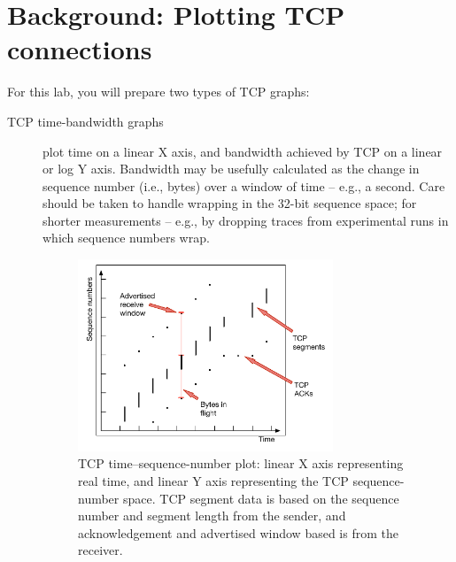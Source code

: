 \documentclass[a4paper,10pt]{article}
\begin{document}
\section*{Background: Plotting TCP connections}

For this lab, you will prepare two types of TCP graphs:

\begin{description}
\item[TCP time-bandwidth graphs] plot time on a linear X axis, and bandwidth
  achieved by TCP on a linear or log Y axis.
  Bandwidth may be usefully calculated as the change in sequence number (i.e.,
  bytes) over a window of time -- e.g., a second.
  Care should be taken to handle wrapping in the 32-bit sequence space; for
  shorter measurements -- e.g., by dropping traces from experimental runs in
  which sequence numbers wrap.

\begin{figure}[t]
\begin{center}
  \includegraphics[width=0.75\textwidth]{../../figures/tcp-time-sequence.pdf}
\end{center}
\caption{TCP time--sequence-number plot: linear X axis representing real time,
and linear Y axis representing the TCP sequence-number space.
TCP segment data is based on the sequence number and segment length from the
sender, and acknowledgement and advertised window based is from the receiver.}
\label{fig:tcp-time-sequence-number-graph}
\end{figure}


\end{description}
\end{document}
